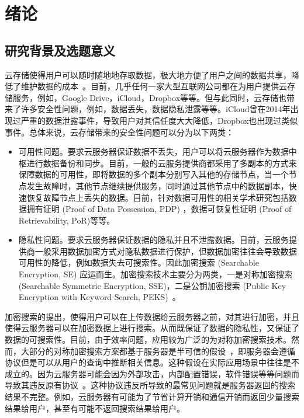 \chapter{绪论}
\label{cha:intro}
\section{研究背景及选题意义}
云存储使得用户可以随时随地地存取数据，极大地方便了用户之间的数据共享，降低了维护数据的成本~\cite{juels2007pors,ateniese2008scalable,kamara2011cs2,wang2011enabling,stefanov2012iris,kamara2013parallel,sun2015catch}。目前，几乎任何一家大型互联网公司都在为用户提供云存储服务，例如，Google Drive，iCloud，Dropbox等等。但与此同时，云存储也带来了许多安全性问题，例如，数据丢失，数据隐私泄露等等。iCloud曾在2014年出现过严重的数据泄露事件，导致用户对其信任度大大降低，Dropbox也出现过类似事件。总体来说，云存储带来的安全性问题可以分为以下两类：
\begin{itemize}
	\item 可用性问题。要求云服务器保证数据不丢失，用户可以将云服务器作为数据中枢进行数据备份和同步。目前，一般的云服务提供商都采用了多副本的方式来保障数据的可用性，即将数据的多个副本分别写入其他的存储节点，当一个节点发生故障时，其他节点继续提供服务，同时通过其他节点中的数据副本，快速恢复故障节点上丢失的数据。目前，针对数据可用性的相关学术研究包括数据拥有证明 (Proof of Data Possession, PDP)\cite{ateniese2007provable, ateniese2008scalable, erway2015dynamic,zhu2012cooperative} ，数据可恢复性证明 (Proof of Retrievability, PoR)\cite{juels2007pors, bowers2009proofs, stefanov2012iris}等等。
	\item 隐私性问题。要求云服务器保证数据的隐私并且不泄露数据。目前，云服务提供商一般采用数据加密方式对隐私数据进行保护，但数据加密往往会导致数据可用性的降低，例如数据失去可搜索性。因此加密搜索 (Searchable Encryption, SE) 应运而生。加密搜索技术主要分为两类，一是对称加密搜索 (Searchable Symmetric Encryption, SSE)\cite{song2000practical,curtmola2011searchable,kamara2012dynamic,cash2014dynamic,wang2016searchable}，二是公钥加密搜索 (Public Key Encryption with Keyword Search, PEKS)~\cite{boneh2004public}。
\end{itemize}

加密搜索的提出，使得用户可以在上传数据给云服务器之前，对其进行加密，并且使得云服务器可以在加密数据上进行搜索。从而既保证了数据的隐私性，又保证了数据的可搜索性。目前，由于效率问题，应用较为广泛的为对称加密搜索技术。然而，大部分的对称加密搜索方案都基于服务器是半可信的假设~\cite{curtmola2011searchable, kamara2012dynamic, cash2014dynamic}，即服务器会遵循协议但是可以从用户的查询中推断相关信息。这种假设在实际应用场景中往往是不成立的。因为云服务器可能会因为外部攻击，内部配置错误，软件错误等等问题而导致其违反原有协议~\cite{sun2015catch,bost2016verifiable}。这种协议违反所导致的最常见问题就是服务器返回的搜索结果不完整。例如，云服务器有可能为了节省计算开销和通信开销而返回少量搜索结果给用户，甚至有可能不返回搜索结果给用户。

